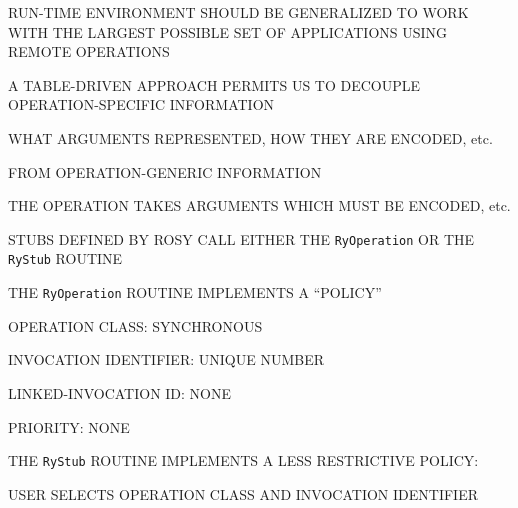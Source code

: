 \begin{bwslide}

\begin{nrtc}
\item	RUN-TIME ENVIRONMENT SHOULD BE GENERALIZED TO WORK WITH THE LARGEST
	POSSIBLE SET OF APPLICATIONS USING REMOTE OPERATIONS

\item	A TABLE-DRIVEN APPROACH PERMITS US TO DECOUPLE OPERATION-SPECIFIC
	INFORMATION
    \begin{nrtc}
    \item	WHAT ARGUMENTS REPRESENTED, HOW THEY ARE ENCODED, etc.
    \end{nrtc}
	FROM OPERATION-GENERIC INFORMATION
    \begin{nrtc}
    \item	THE OPERATION TAKES ARGUMENTS WHICH MUST BE ENCODED, etc.
    \end{nrtc}
\end{nrtc}
\end{bwslide}


\begin{bwslide}

\begin{nrtc}
\item	STUBS DEFINED BY ROSY CALL EITHER THE \verb"RyOperation" OR THE
	\verb"RyStub" ROUTINE

\item	THE \verb"RyOperation" ROUTINE IMPLEMENTS A ``POLICY''
    \begin{nrtc}
    \item	OPERATION CLASS: SYNCHRONOUS

    \item	INVOCATION IDENTIFIER: UNIQUE NUMBER

    \item	LINKED-INVOCATION ID: NONE

    \item	PRIORITY: NONE
    \end{nrtc}

\item	THE \verb"RyStub" ROUTINE IMPLEMENTS A LESS RESTRICTIVE POLICY:
    \begin{nrtc}
    \item	USER SELECTS OPERATION CLASS AND INVOCATION IDENTIFIER
    \end{nrtc}
\end{nrtc}
\end{bwslide}



